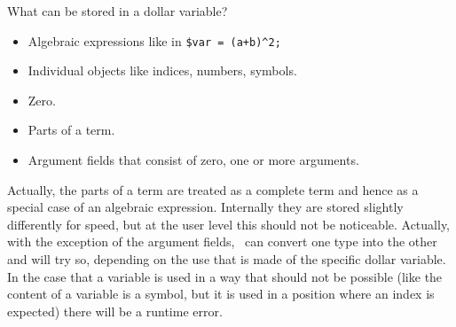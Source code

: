 What can be stored in a dollar variable?
\begin{itemize}
\item Algebraic expressions like in \verb:$var = (a+b)^2;:
\item Individual objects like indices, numbers, symbols.
\item Zero.
\item Parts of a term.
\item Argument fields that consist of zero, one or 
more arguments.
\end{itemize}
Actually, the parts of a term are treated as a complete term and hence as a 
special case of an algebraic expression. Internally they are stored 
slightly differently for speed, but at the user level this should not be 
noticeable. Actually, with the exception of the argument fields, \FORM\ can 
convert one type into the other and will try so, depending on the use that 
is made of the specific dollar variable. In the case that a variable is 
used in a way that should not be possible (like the content of a variable 
is a symbol, but it is used in a position where an index is expected) there 
will be a runtime error.

